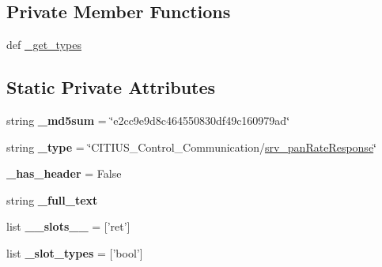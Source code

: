 \subsection*{\-Private \-Member \-Functions}
\begin{DoxyCompactItemize}
\item 
def \hyperlink{class_c_i_t_i_u_s___control___communication_1_1srv_1_1__srv__pan_rate_1_1srv__pan_rate_response_a47f0e7a9dd8275f81e6745b38e90da4c}{\-\_\-get\-\_\-types}
\end{DoxyCompactItemize}
\subsection*{\-Static \-Private \-Attributes}
\begin{DoxyCompactItemize}
\item 
\hypertarget{class_c_i_t_i_u_s___control___communication_1_1srv_1_1__srv__pan_rate_1_1srv__pan_rate_response_ad5af9c78275189727569284c7637118c}{string {\bfseries \-\_\-md5sum} = \char`\"{}e2cc9e9d8c464550830df49c160979ad\char`\"{}}\label{class_c_i_t_i_u_s___control___communication_1_1srv_1_1__srv__pan_rate_1_1srv__pan_rate_response_ad5af9c78275189727569284c7637118c}

\item 
\hypertarget{class_c_i_t_i_u_s___control___communication_1_1srv_1_1__srv__pan_rate_1_1srv__pan_rate_response_ae4e42cfaaf1ebb6156089fcaaea33e5d}{string {\bfseries \-\_\-type} = \char`\"{}\-C\-I\-T\-I\-U\-S\-\_\-\-Control\-\_\-\-Communication/\hyperlink{class_c_i_t_i_u_s___control___communication_1_1srv_1_1__srv__pan_rate_1_1srv__pan_rate_response}{srv\-\_\-pan\-Rate\-Response}\char`\"{}}\label{class_c_i_t_i_u_s___control___communication_1_1srv_1_1__srv__pan_rate_1_1srv__pan_rate_response_ae4e42cfaaf1ebb6156089fcaaea33e5d}

\item 
\hypertarget{class_c_i_t_i_u_s___control___communication_1_1srv_1_1__srv__pan_rate_1_1srv__pan_rate_response_aff707e30aee3e79080b0a39b21f7d9bb}{{\bfseries \-\_\-has\-\_\-header} = \-False}\label{class_c_i_t_i_u_s___control___communication_1_1srv_1_1__srv__pan_rate_1_1srv__pan_rate_response_aff707e30aee3e79080b0a39b21f7d9bb}

\item 
string {\bfseries \-\_\-full\-\_\-text}
\item 
\hypertarget{class_c_i_t_i_u_s___control___communication_1_1srv_1_1__srv__pan_rate_1_1srv__pan_rate_response_a0cbee8f5750e464fa868d5b3f71b3d26}{list {\bfseries \-\_\-\-\_\-slots\-\_\-\-\_\-} = \mbox{[}'ret'\mbox{]}}\label{class_c_i_t_i_u_s___control___communication_1_1srv_1_1__srv__pan_rate_1_1srv__pan_rate_response_a0cbee8f5750e464fa868d5b3f71b3d26}

\item 
\hypertarget{class_c_i_t_i_u_s___control___communication_1_1srv_1_1__srv__pan_rate_1_1srv__pan_rate_response_a59ac6e5e085161cbea804bd9af2a4300}{list {\bfseries \-\_\-slot\-\_\-types} = \mbox{[}'bool'\mbox{]}}\label{class_c_i_t_i_u_s___control___communication_1_1srv_1_1__srv__pan_rate_1_1srv__pan_rate_response_a59ac6e5e085161cbea804bd9af2a4300}

\end{DoxyCompactItemize}


